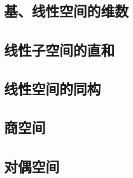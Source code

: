\documentclass[12pt, a4paper, oneside, UTF8]{ctexbook}
\begin{document}
	\section{基、线性空间的维数}
	\section{线性子空间的直和}
	\section{线性空间的同构}
	\section{商空间}
	\section{对偶空间}
\ifx\allfiles\undefined
\end{document}
